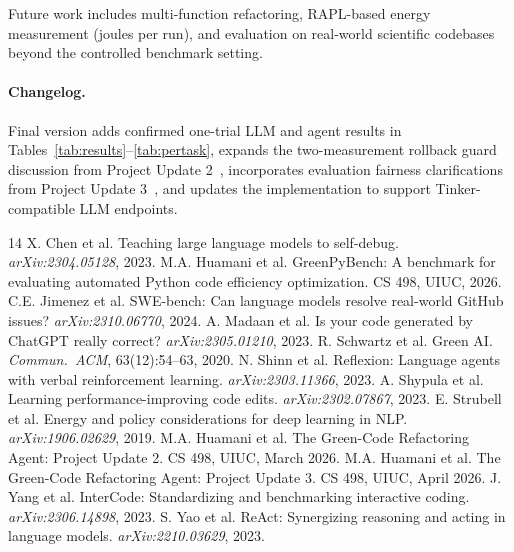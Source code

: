 \documentclass{article}
\begin{document}
Future work includes multi-function refactoring, RAPL-based energy measurement (joules per run), and evaluation on real-world scientific codebases beyond the controlled benchmark setting.

\paragraph{Changelog.}
Final version adds confirmed one-trial LLM and agent results in Tables~\ref{tab:results}--\ref{tab:pertask}, expands the two-measurement rollback guard discussion from Project Update 2~\cite{update2}, incorporates evaluation fairness clarifications from Project Update 3~\cite{update3}, and updates the implementation to support Tinker-compatible LLM endpoints.

\begin{thebibliography}{14}
 X. Chen et al. Teaching large language models to self-debug. \emph{arXiv:2304.05128}, 2023.
 M.A. Huamani et al. GreenPyBench: A benchmark for evaluating automated Python code efficiency optimization. CS 498, UIUC, 2026.
 C.E. Jimenez et al. SWE-bench: Can language models resolve real-world GitHub issues? \emph{arXiv:2310.06770}, 2024.
 A. Madaan et al. Is your code generated by ChatGPT really correct? \emph{arXiv:2305.01210}, 2023.
 R. Schwartz et al. Green AI. \emph{Commun.\ ACM}, 63(12):54--63, 2020.
 N. Shinn et al. Reflexion: Language agents with verbal reinforcement learning. \emph{arXiv:2303.11366}, 2023.
 A. Shypula et al. Learning performance-improving code edits. \emph{arXiv:2302.07867}, 2023.
 E. Strubell et al. Energy and policy considerations for deep learning in NLP. \emph{arXiv:1906.02629}, 2019.
 M.A. Huamani et al. The Green-Code Refactoring Agent: Project Update 2. CS 498, UIUC, March 2026.
 M.A. Huamani et al. The Green-Code Refactoring Agent: Project Update 3. CS 498, UIUC, April 2026.
 J. Yang et al. InterCode: Standardizing and benchmarking interactive coding. \emph{arXiv:2306.14898}, 2023.
 S. Yao et al. ReAct: Synergizing reasoning and acting in language models. \emph{arXiv:2210.03629}, 2023.
\end{thebibliography}
\end{document}
